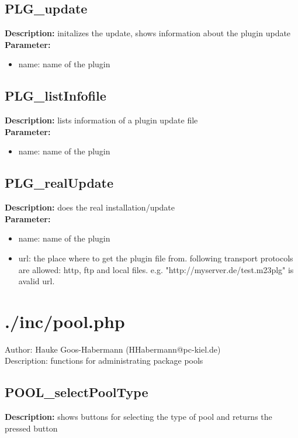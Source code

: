 \subsection{PLG\_update}
\textbf{Description:} initalizes the update, shows information about the plugin update\\
\textbf{Parameter:}
\begin{itemize}
\item name: name of the plugin
\end{itemize}

\subsection{PLG\_listInfofile}
\textbf{Description:} lists information of a plugin update file\\
\textbf{Parameter:}
\begin{itemize}
\item name: name of the plugin
\end{itemize}

\subsection{PLG\_realUpdate}
\textbf{Description:} does the real installation/update\\
\textbf{Parameter:}
\begin{itemize}
\item name: name of the plugin
\item url: the place where to get the plugin file from. following transport protocols are allowed: http, ftp and local files. e.g. "http://myserver.de/test.m23plg" is avalid url.
\end{itemize}

\newpage\section{./inc/pool.php}
 Author: Hauke Goos-Habermann (HHabermann@pc-kiel.de)\\
 Description: functions for administrating package pools\\

\subsection{POOL\_selectPoolType}
\textbf{Description:} shows buttons for selecting the type of pool and returns the pressed button\\

